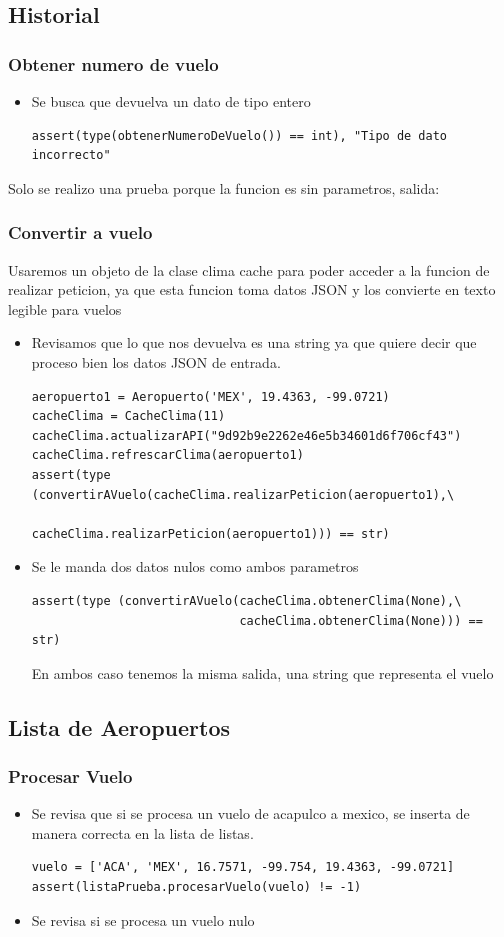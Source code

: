 \documentclass[12pt]{article}
\begin{document}
\subsection{Historial}
\subsubsection{Obtener numero de vuelo}
\begin{itemize}
\item Se busca que devuelva un dato de tipo entero
\begin{verbatim}
assert(type(obtenerNumeroDeVuelo()) == int), "Tipo de dato incorrecto"
\end{verbatim}
\end{itemize}
Solo se realizo una prueba porque la funcion es sin parametros, salida:
\subsubsection{Convertir a vuelo}
Usaremos un objeto de la clase clima cache para poder acceder a la funcion de realizar peticion, ya que esta funcion toma datos JSON y los convierte en texto legible para vuelos
\begin{itemize}
\item Revisamos que lo que nos devuelva es una string ya que quiere decir que proceso bien los datos JSON de entrada.
\begin{verbatim}
aeropuerto1 = Aeropuerto('MEX', 19.4363, -99.0721)
cacheClima = CacheClima(11)
cacheClima.actualizarAPI("9d92b9e2262e46e5b34601d6f706cf43")
cacheClima.refrescarClima(aeropuerto1)
assert(type (convertirAVuelo(cacheClima.realizarPeticion(aeropuerto1),\
                             cacheClima.realizarPeticion(aeropuerto1))) == str)
\end{verbatim}
\item Se le manda dos datos nulos como ambos parametros

\begin{verbatim}
assert(type (convertirAVuelo(cacheClima.obtenerClima(None),\
                             cacheClima.obtenerClima(None))) == str)
\end{verbatim}
  En ambos caso tenemos la misma salida, una string que representa el vuelo
\end{itemize}
\subsection{Lista de Aeropuertos}
\subsubsection{Procesar Vuelo}
\begin{itemize}
\item Se revisa que si se procesa un vuelo de acapulco a mexico, se inserta de manera correcta en la lista de listas.
\begin{verbatim}
vuelo = ['ACA', 'MEX', 16.7571, -99.754, 19.4363, -99.0721]
assert(listaPrueba.procesarVuelo(vuelo) != -1)    
\end{verbatim}
\item Se revisa si se procesa un vuelo nulo
\end{itemize}
\end{document}
